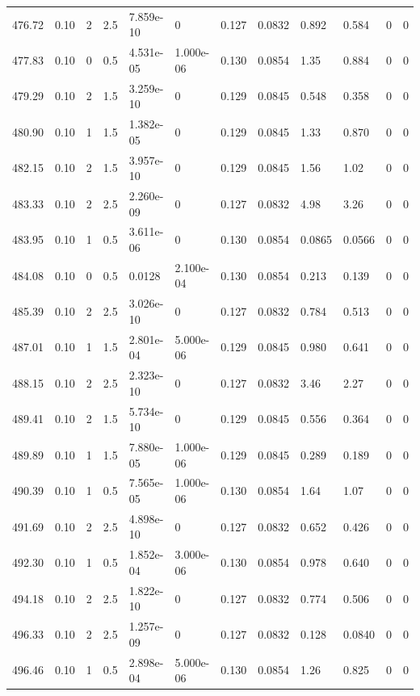 \documentclass[preview]{standalone}
\begin{document}
{{{{{{{{\begin{tabular}{L{1.2cm}C{1.2cm} C{0.3cm}C{0.5cm} C{1.4cm}C{1.4cm} C{1.4cm}C{1.4cm} C{1.6cm}C{1.6cm} C{1.6cm}C{1.6cm}}
  476.72  &  0.10  & 2     & 2.5 &  7.859e-10  & 0  &  0.127&   0.0832& 0.892 & 0.584   &  0 & 0  \\ 
  477.83  &  0.10  & 0     & 0.5 &  4.531e-05  & 1.000e-06  &  0.130&   0.0854& 1.35 & 0.884   &  0 & 0  \\ 
  479.29  &  0.10  & 2     & 1.5 &  3.259e-10  & 0  &  0.129&   0.0845& 0.548 & 0.358   &  0 & 0  \\ 
  480.90  &  0.10  & 1     & 1.5 &  1.382e-05  & 0  &  0.129&   0.0845& 1.33 & 0.870   &  0 & 0  \\ 
  482.15  &  0.10  & 2     & 1.5 &  3.957e-10  & 0  &  0.129&   0.0845& 1.56 & 1.02   &  0 & 0  \\ 
  483.33  &  0.10  & 2     & 2.5 &  2.260e-09  & 0  &  0.127&   0.0832& 4.98 & 3.26   &  0 & 0  \\ 
  483.95  &  0.10  & 1     & 0.5 &  3.611e-06  & 0  &  0.130&   0.0854& 0.0865 & 0.0566   &  0 & 0  \\ 
  484.08  &  0.10  & 0     & 0.5 &  0.0128  & 2.100e-04  &  0.130&   0.0854& 0.213 & 0.139   &  0 & 0  \\ 
  485.39  &  0.10  & 2     & 2.5 &  3.026e-10  & 0  &  0.127&   0.0832& 0.784 & 0.513   &  0 & 0  \\ 
  487.01  &  0.10  & 1     & 1.5 &  2.801e-04  & 5.000e-06  &  0.129&   0.0845& 0.980 & 0.641   &  0 & 0  \\ 
  488.15  &  0.10  & 2     & 2.5 &  2.323e-10  & 0  &  0.127&   0.0832& 3.46 & 2.27   &  0 & 0  \\ 
  489.41  &  0.10  & 2     & 1.5 &  5.734e-10  & 0  &  0.129&   0.0845& 0.556 & 0.364   &  0 & 0  \\ 
  489.89  &  0.10  & 1     & 1.5 &  7.880e-05  & 1.000e-06  &  0.129&   0.0845& 0.289 & 0.189   &  0 & 0  \\ 
  490.39  &  0.10  & 1     & 0.5 &  7.565e-05  & 1.000e-06  &  0.130&   0.0854& 1.64 & 1.07   &  0 & 0  \\ 
  491.69  &  0.10  & 2     & 2.5 &  4.898e-10  & 0  &  0.127&   0.0832& 0.652 & 0.426   &  0 & 0  \\ 
  492.30  &  0.10  & 1     & 0.5 &  1.852e-04  & 3.000e-06  &  0.130&   0.0854& 0.978 & 0.640   &  0 & 0  \\ 
  494.18  &  0.10  & 2     & 2.5 &  1.822e-10  & 0  &  0.127&   0.0832& 0.774 & 0.506   &  0 & 0  \\ 
  496.33  &  0.10  & 2     & 2.5 &  1.257e-09  & 0  &  0.127&   0.0832& 0.128 & 0.0840   &  0 & 0  \\ 
  496.46  &  0.10  & 1     & 0.5 &  2.898e-04  & 5.000e-06  &  0.130&   0.0854& 1.26 & 0.825   &  0 & 0  \\ 

\end{tabular}}}}}}}}}
\end{document}
